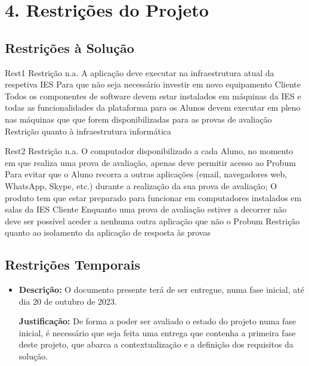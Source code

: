 \chapter*{4. Restrições do Projeto}  

\section*{Restrições à Solução}

{\TextoCor

\req
    {Rest1} %
    {Restrição} %
    {n.a.} %
    {A aplicação deve executar na infraestrutura atual da respetiva IES} %
    {Para que não seja necessário investir em novo equipamento} %
    {Cliente} %
    {Todos os componentes de software devem estar instalados em máquinas da IES e todas as funcionalidades da plataforma para os Alunos devem executar em pleno nas máquinas que que forem disponibilizadas para as provas de avaliação} %
    {\prioMust} %
    {Restrição quanto à infraestrutura informática} %

\req
    {Rest2} %
    {Restrição} %
    {n.a.} %
    {O computador disponibilizado a cada Aluno, no momento em que realiza uma prova de avaliação, apenas deve permitir acesso ao Probum} %
    {Para evitar que o Aluno recorra a outras aplicações (email, navegadores web, WhatsApp, Skype, etc.) durante a realização da sua prova de avaliação; O produto tem que estar preparado para funcionar em computadores instalados em salas da IES } %
    {Cliente} %
    {Enquanto uma prova de avaliação estiver a decorrer não deve ser possível aceder a nenhuma outra aplicação que não o Probum} %
    {\prioMust} %
    {Restrição quanto ao isolamento da aplicação de resposta às provas} %

}

\section*{Restrições Temporais}
{\TextoCor
\begin{itemize}
    \item \textbf{Descrição:} O documento presente terá de ser entregue, numa fase inicial, até dia 20 de outubro de 2023.
    
    \textbf{Justificação:} De forma a poder ser avaliado o estado do projeto numa fase inicial, é necessário que seja feita uma entrega que contenha a primeira fase deste projeto, que abarca a contextualização e a definição dos requisitos da solução.
\end{itemize}
}

